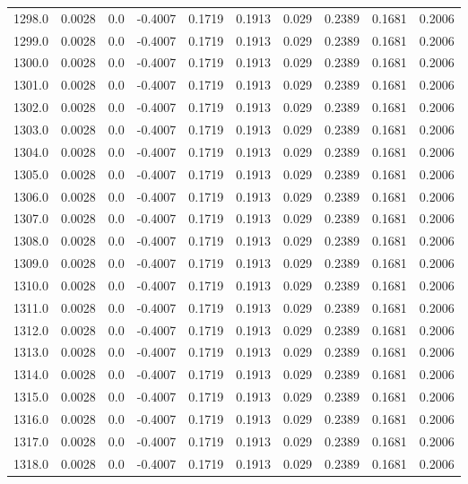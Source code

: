 \begin{longtable}{lrrrrrrrrr}
1298.0 & 0.0028 & 0.0 & -0.4007 & 0.1719 & 0.1913 & 0.029 & 0.2389 & 0.1681 & 0.2006 \\
1299.0 & 0.0028 & 0.0 & -0.4007 & 0.1719 & 0.1913 & 0.029 & 0.2389 & 0.1681 & 0.2006 \\
1300.0 & 0.0028 & 0.0 & -0.4007 & 0.1719 & 0.1913 & 0.029 & 0.2389 & 0.1681 & 0.2006 \\
1301.0 & 0.0028 & 0.0 & -0.4007 & 0.1719 & 0.1913 & 0.029 & 0.2389 & 0.1681 & 0.2006 \\
1302.0 & 0.0028 & 0.0 & -0.4007 & 0.1719 & 0.1913 & 0.029 & 0.2389 & 0.1681 & 0.2006 \\
1303.0 & 0.0028 & 0.0 & -0.4007 & 0.1719 & 0.1913 & 0.029 & 0.2389 & 0.1681 & 0.2006 \\
1304.0 & 0.0028 & 0.0 & -0.4007 & 0.1719 & 0.1913 & 0.029 & 0.2389 & 0.1681 & 0.2006 \\
1305.0 & 0.0028 & 0.0 & -0.4007 & 0.1719 & 0.1913 & 0.029 & 0.2389 & 0.1681 & 0.2006 \\
1306.0 & 0.0028 & 0.0 & -0.4007 & 0.1719 & 0.1913 & 0.029 & 0.2389 & 0.1681 & 0.2006 \\
1307.0 & 0.0028 & 0.0 & -0.4007 & 0.1719 & 0.1913 & 0.029 & 0.2389 & 0.1681 & 0.2006 \\
1308.0 & 0.0028 & 0.0 & -0.4007 & 0.1719 & 0.1913 & 0.029 & 0.2389 & 0.1681 & 0.2006 \\
1309.0 & 0.0028 & 0.0 & -0.4007 & 0.1719 & 0.1913 & 0.029 & 0.2389 & 0.1681 & 0.2006 \\
1310.0 & 0.0028 & 0.0 & -0.4007 & 0.1719 & 0.1913 & 0.029 & 0.2389 & 0.1681 & 0.2006 \\
1311.0 & 0.0028 & 0.0 & -0.4007 & 0.1719 & 0.1913 & 0.029 & 0.2389 & 0.1681 & 0.2006 \\
1312.0 & 0.0028 & 0.0 & -0.4007 & 0.1719 & 0.1913 & 0.029 & 0.2389 & 0.1681 & 0.2006 \\
1313.0 & 0.0028 & 0.0 & -0.4007 & 0.1719 & 0.1913 & 0.029 & 0.2389 & 0.1681 & 0.2006 \\
1314.0 & 0.0028 & 0.0 & -0.4007 & 0.1719 & 0.1913 & 0.029 & 0.2389 & 0.1681 & 0.2006 \\
1315.0 & 0.0028 & 0.0 & -0.4007 & 0.1719 & 0.1913 & 0.029 & 0.2389 & 0.1681 & 0.2006 \\
1316.0 & 0.0028 & 0.0 & -0.4007 & 0.1719 & 0.1913 & 0.029 & 0.2389 & 0.1681 & 0.2006 \\
1317.0 & 0.0028 & 0.0 & -0.4007 & 0.1719 & 0.1913 & 0.029 & 0.2389 & 0.1681 & 0.2006 \\
1318.0 & 0.0028 & 0.0 & -0.4007 & 0.1719 & 0.1913 & 0.029 & 0.2389 & 0.1681 & 0.2006 \\

\end{longtable}
